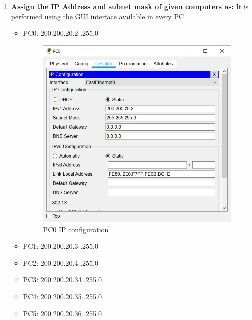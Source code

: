 \documentclass[a4paper,11pt]{article}
\begin{document}
\begin{enumerate}
      \item \textbf{Assign the IP Address and subnet mask of given computers as:}
            It is performed using the GUI interface available in every PC
            \begin{itemize}
                  \item  PC0: 200.200.20.2 \quad {}.255.0
                        \begin{figure}[H]
                              \centering
                              \includegraphics[scale=0.8,cframe=blue 0.5pt 3pt]{PC0 ip sub.jpg}
                              \caption{PC0 IP configuration}
                        \end{figure}
                  \item PC1: 200.200.20.3 \quad {}.255.0
                  \item PC2: 200.200.20.4 \quad {}.255.0
                  \item PC3: 200.200.20.34 \quad {}.255.0
                  \item PC4: 200.200.20.35 \quad {}.255.0
                  \item PC5: 200.200.20.36 \quad {}.255.0
            \end{itemize}

\end{enumerate}
\end{document}
